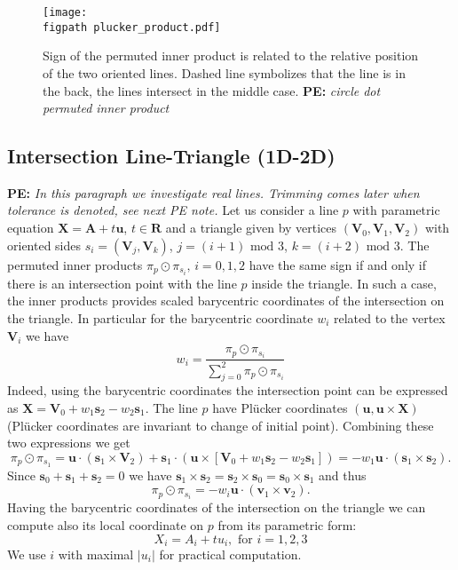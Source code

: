 \documentclass{elsarticle}
\newcommand{\figpath}{figures/}
\def\vc#1{\mathbf{\boldsymbol{#1}}}     %
\newcommand{\R}{\mathbf{R}}
\newcommand{\notePE}[1]{{\color{Orange} \textbf{PE: } \textit{#1}}}
\newcommand{\plucker}{Pl\"{u}cker }
\begin{document}
\begin{figure}[!htb]
  \begin{center}        
    \texttt{[image: \\figpath plucker\_product.pdf]}
  \end{center}
  \caption{Sign of the permuted inner product is related to the relative position of the two oriented lines. Dashed line symbolizes that the line is in the back, the lines intersect in the middle case.
           \notePE{circle dot permuted inner product}}
  \label{fig:plucker_products}
\end{figure}



\subsection{Intersection Line-Triangle (1D-2D)}
\notePE{In this paragraph we investigate real lines. Trimming comes later when tolerance is denoted, see next PE note.}
Let us consider a line $p$ with parametric equation $\vc X = \vc A + t\vc u$, $t\in\R$ and a triangle given by vertices $(\vc V_0, \vc V_1, \vc V_2)$ 
with oriented sides $s_i=(\vc V_j, \vc V_k)$, $j=(i+1)\text{ mod }3$, $k=(i+2)\text{ mod }3$. The permuted inner products $\pi_p \odot \pi_{s_i},\, i=0,1,2$ have the same sign if and only if there
is an intersection point with the       line $p$ inside the triangle. In such a case, the inner products provides scaled barycentric coordinates of the intersection on the triangle.
In particular for the barycentric coordinate $w_i$ related to the vertex $\vc V_i$ we have
\[
   w_i = \frac{\pi_p \odot \pi_{s_i}}{ \sum_{j=0}^{2} \pi_p \odot \pi_{s_i} }
\]
Indeed, using the barycentric coordinates the intersection point can be expressed as $\vc X = \vc V_0 + w_1 \vc s_2 - w_2 \vc s_1$.
The line $p$ have \plucker coordinates $(\vc u, \vc u \times \vc X)$ (\plucker coordinates are invariant to change of initial point). Combining these two expressions we get
\[
   \pi_p \odot \pi_{s_1} = \vc u \cdot (\vc s_1 \times \vc V_2) + \vc s_1 \cdot ( \vc u \times [\vc V_0 + w_1\vc s_2 - w_2 \vc s_1])
   =-w_1 \vc u \cdot (\vc s_1 \times \vc s_2).
\]
Since $\vc s_0 + \vc s_1 + \vc s_2=0$ we have $ \vc s_1 \times \vc s_2 = \vc s_2 \times \vc s_0 = \vc s_0 \times \vc s_1$ and thus
\[
   \pi_p \odot \pi_{s_i} = -w_i \vc u \cdot (\vc v_1 \times \vc v_2).
\]
Having the barycentric coordinates of the intersection on the triangle we can compute also its local coordinate on $p$ from its parametric form:
\[
   X_i  = A_i + t u_i, \text{ for } i=1,2,3
\]
We use $i$ with maximal $|u_i|$ for practical computation.
\end{document}
